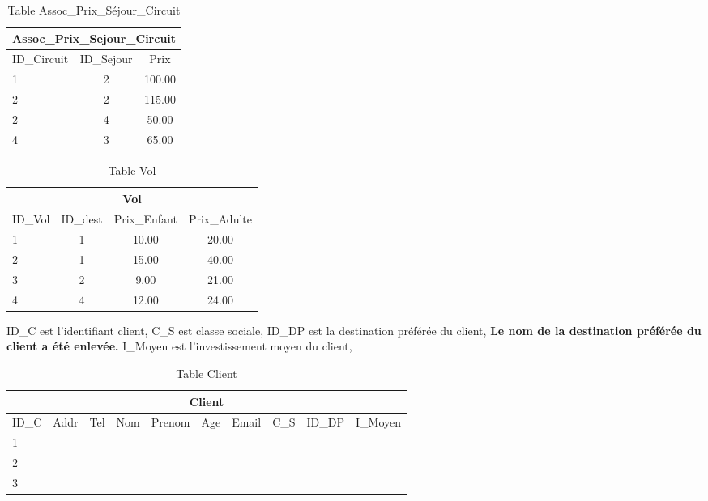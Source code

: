 \documentclass[10pt]{article}
\begin{document}

\begin{table}[h]
\begin{center}
\begin{tabular}{|l|c|c|}
\hline
\multicolumn{3}{|c|}{Assoc\_Prix\_Sejour\_Circuit}\\
\hline
ID\_Circuit& ID\_Sejour & Prix\\
\hline
1 & 2& 100.00\\
\hline
2 & 2& 115.00\\
\hline
2 & 4& 50.00\\
\hline
4 & 3& 65.00\\
\hline
\end{tabular}
\end{center}
\caption{Table Assoc\_Prix\_Séjour\_Circuit}
\end{table}
\newpage

\begin{table}[h]
\begin{center}
\begin{tabular}{|l|c|c|c|}
\hline
\multicolumn{4}{|c|}{Vol}\\
\hline
ID\_Vol& ID\_dest & Prix\_Enfant& Prix\_Adulte\\
\hline
1 & 1& 10.00 & 20.00\\
\hline
2 & 1& 15.00& 40.00\\
\hline
3 & 2& 9.00& 21.00\\
\hline
4 & 4& 12.00& 24.00\\
\hline
\end{tabular}
\end{center}
\caption{Table Vol}
\end{table}


\begin{table}[h]
ID\_C est l'identifiant client,
C\_S est classe sociale,
ID\_DP est la destination préférée du client,
\textbf{Le nom de la destination préférée du client a été enlevée.}
I\_Moyen est l'investissement moyen du client,
\bigskip

\begin{tabular}{|l|c|c|c|c|c|c|c|c|c|}
\hline
\multicolumn{10}{|c|}{Client}\\
\hline
ID\_C& Addr& Tel & Nom & Prenom & Age & Email&C\_S & ID\_DP &I\_Moyen\\
\hline
1 & & &&  &  & &&&\\
\hline
2 & & &&  &  & &&&\\
\hline
3 & & &&  &  & &&&\\
\hline
\end{tabular}
\caption{Table Client}
\end{table}
\end{document}
